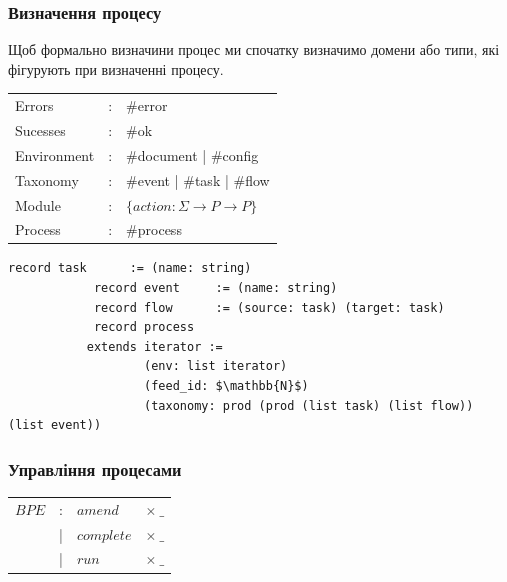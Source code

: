 \documentclass[11pt,oneside]{article}
\begin{document}
\newpage
   \subsubsection{Визначення процесу}

   Щоб формально визначини процес ми спочатку визначимо домени або типи,
   які фігурують при визначенні процесу.

\begin{center}
\begin{tabular}{lcl}
                Errors &:& \#error\\
              Sucesses &:& \#ok \\
           Environment &:& \#document | \#config\\
              Taxonomy &:& \#event    | \#task   | \#flow\\
                Module &:& $\{ action : \Sigma \rightarrow P \rightarrow P \}$ \\ \hline
               Process &:& \#process\\
\end{tabular}
\end{center}

\begin{center}
\begin{lstlisting}[mathescape=true]
            record task      := (name: string)
            record event     := (name: string)
            record flow      := (source: task) (target: task)
            record process
           extends iterator :=
                   (env: list iterator)
                   (feed_id: $\mathbb{N}$)
                   (taxonomy: prod (prod (list task) (list flow)) (list event))
\end{lstlisting}
\end{center}

   \subsubsection{Управління процесами}

\begin{center}
\begin{tabular}{llll}
 $BPE$      &:& $amend$       & $\times\ \_$      \\
            &|& $complete$    & $\times\ \_$         \\
            &|& $run$         & $\times\ \_$          \\
\end{tabular}
\end{center}
\end{document}
